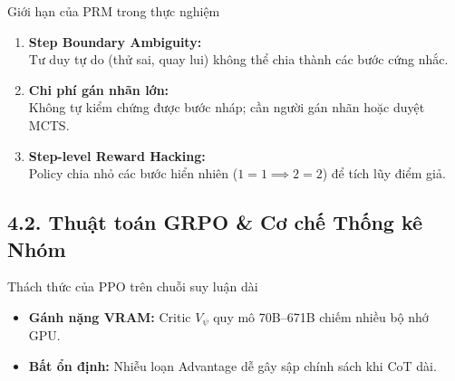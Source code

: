 \begin{frame}{Giới hạn của PRM trong thực nghiệm}
  \begin{enumerate}\setlength{\itemsep}{5pt}
    \item \textbf{Step Boundary Ambiguity:}\\
      \small Tư duy tự do (thử sai, quay lui) không thể chia thành các bước cứng nhắc.
    \item \textbf{Chi phí gán nhãn lớn:}\\
      \small Không tự kiểm chứng được bước nháp; cần người gán nhãn hoặc duyệt MCTS.
    \item \textbf{Step-level Reward Hacking:}\\
      \small Policy chia nhỏ các bước hiển nhiên ($1=1 \implies 2=2$) để tích lũy điểm giả.
  \end{enumerate}
  \par\vspace{0pt}
\end{frame}

\subsection{4.2. Thuật toán GRPO \& Cơ chế Thống kê Nhóm}

\begin{frame}{Thách thức của PPO trên chuỗi suy luận dài}
  \small
  \begin{itemize}\setlength{\itemsep}{6pt}
    \item \textbf{Gánh nặng VRAM:} Critic $V_\psi$ quy mô 70B--671B chiếm nhiều bộ nhớ GPU.
    \item \textbf{Bất ổn định:} Nhiễu loạn Advantage dễ gây sập chính sách khi CoT dài.
  \end{itemize}
  \par\vspace{0pt}
\end{frame}

